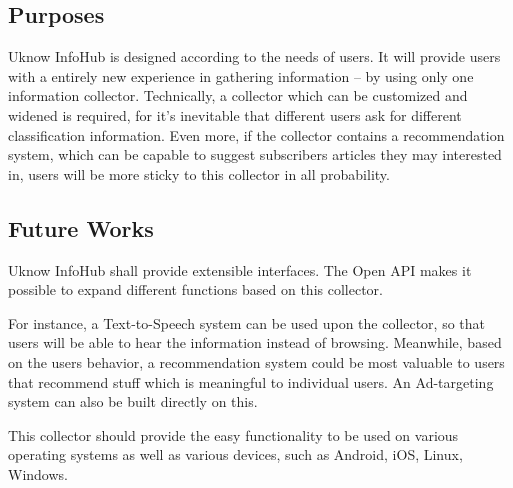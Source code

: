 \subsection{Purposes}
    Uknow InfoHub is designed according to the needs of users.
    It will provide users with a entirely new experience in gathering information --
    by using only one information collector.
    Technically, a collector which can be customized and
    widened is required, for it's inevitable that different users ask for
    different classification information.
    Even more, if the collector contains a recommendation system, which can be capable to suggest subscribers
    articles they may interested in, users will be more sticky to
    this collector in all probability.

    \subsection{Future Works}

 Uknow InfoHub shall provide extensible interfaces.
 The Open API makes it possible to expand different functions based on this collector.

 For instance, a Text-to-Speech system can be used upon the collector, so that
 users will be able to hear the information instead of browsing.
 Meanwhile, based on the users behavior, a recommendation system could be most valuable
 to users that recommend stuff which is meaningful to individual users. An Ad-targeting system
 can also be built directly on this.

 This collector should provide the easy functionality to be used
 on various operating systems as well as various devices, such as Android, iOS, Linux, Windows.
